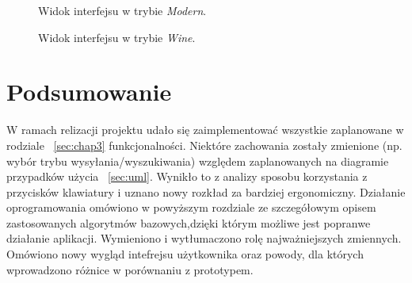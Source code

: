 \documentclass[twoside,a4paper]{book}
\begin{document}
				 \begin{figure}
		\centering
		\caption{Widok interfejsu w trybie \textit{Modern}.}
		\label{fig:modern}
		\end{figure}
		 \begin{figure}
		\centering
		\caption{Widok interfejsu w trybie \textit{Wine}.}
		\label{fig:wine}
		\end{figure}
\section{Podsumowanie}
W ramach relizacji projektu udało się zaimplementować wszystkie zaplanowane w rodziale ~\ref{sec:chap3} funkcjonalności. Niektóre zachowania zostały zmienione (np. wybór trybu wysyłania/wyszukiwania) względem zaplanowanych na diagramie przypadków użycia ~\ref{sec:uml}. Wynikło to z analizy sposobu korzystania z przycisków klawiatury i uznano nowy rozkład za bardziej ergonomiczny. Działanie oprogramowania omówiono w powyższym rozdziale ze szczegółowym opisem zastosowanych algorytmów bazowych,dzięki którym możliwe jest popranwe działanie aplikacji. Wymieniono i wytłumaczono rolę najważniejszych zmiennych. Omówiono nowy wygląd intefrejsu użytkownika oraz powody, dla których wprowadzono różnice w porównaniu z prototypem.  

 
\end{document}
